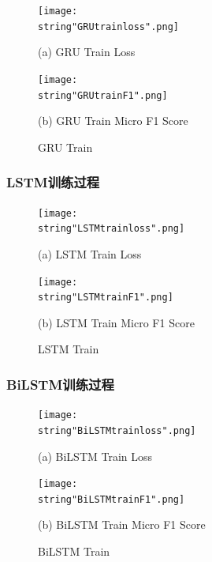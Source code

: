 \documentclass[UTF8]{ctexart}
\begin{document}
\begin{figure}[H]
    \begin{minipage}[t]{0.5\linewidth}
        \centering
        \texttt{[image: \\string"GRUtrainloss".png]}
        \centerline{(a) GRU Train Loss}
    \end{minipage}%
    \begin{minipage}[t]{0.5\linewidth}
        \centering
        \texttt{[image: \\string"GRUtrainF1".png]}
        \centerline{(b) GRU Train Micro F1 Score}
    \end{minipage}
    \label{fig:5}
    \caption{GRU Train}
\end{figure}


\subsubsection{LSTM训练过程}
\begin{figure}[H]
    \begin{minipage}[t]{0.5\linewidth}
        \centering
        \texttt{[image: \\string"LSTMtrainloss".png]}
        \centerline{(a) LSTM Train Loss}
    \end{minipage}%
    \begin{minipage}[t]{0.5\linewidth}
        \centering
        \texttt{[image: \\string"LSTMtrainF1".png]}
        \centerline{(b) LSTM Train Micro F1 Score}
    \end{minipage}
    \label{fig:6}
    \caption{LSTM Train}
\end{figure}

\subsubsection{BiLSTM训练过程}
\begin{figure}[H]
    \begin{minipage}[t]{0.5\linewidth}
        \centering
        \texttt{[image: \\string"BiLSTMtrainloss".png]}
        \centerline{(a) BiLSTM Train Loss}
    \end{minipage}%
    \begin{minipage}[t]{0.5\linewidth}
        \centering
        \texttt{[image: \\string"BiLSTMtrainF1".png]}
        \centerline{(b) BiLSTM Train Micro F1 Score}
    \end{minipage}
    \label{fig:7}
    \caption{BiLSTM Train}
\end{figure}
\end{document}
